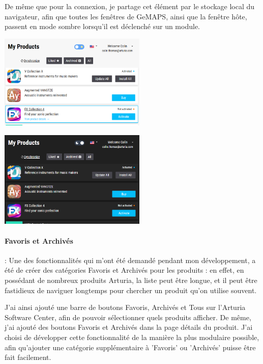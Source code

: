 \documentclass[francais]{rapportPFE}  %
\begin{document}
De même que pour la connexion, je partage cet élément par le stockage local du navigateur, afin que toutes les fenêtres de GeMAPS, ainsi que la fenêtre hôte, passent en mode sombre lorsqu'il est déclenché sur un module.

\begin{center}
    \centering
    \begin{minipage}{.5\textwidth}
    \centering
    \includegraphics[width=7cm]{graphics/daymode.png}
    \label{fig:test1}
    \end{minipage}%
    \begin{minipage}{.5\textwidth}
    \centering
    \includegraphics[width=7cm]{graphics/darkmode.png}
    \label{fig:test2}
    \end{minipage}
    \end{center}


\paragraph{Favoris et Archivés}: 
Une des fonctionnalités qui m'ont été demandé pendant mon développement, a été de créer des catégories Favoris et Archivés pour les produits : en effet, en possédant de nombreux produits Arturia, la liste peut être longue, et il peut être fastidieux de naviguer longtemps pour chercher un produit qu'on utilise souvent.

J'ai ainsi ajouté une barre de boutons Favoris, Archivés et Tous sur l'Arturia Software Center, afin de pouvoir sélectionner quels produits afficher.
De même, j'ai ajouté des boutons Favoris et Archivés dans la page détails du produit. 
J'ai choisi de développer cette fonctionnalité de la manière la plus modulaire possible, afin qu'ajouter une catégorie supplémentaire à 'Favoris' ou 'Archivés' puisse être fait facilement. 
\end{document}
